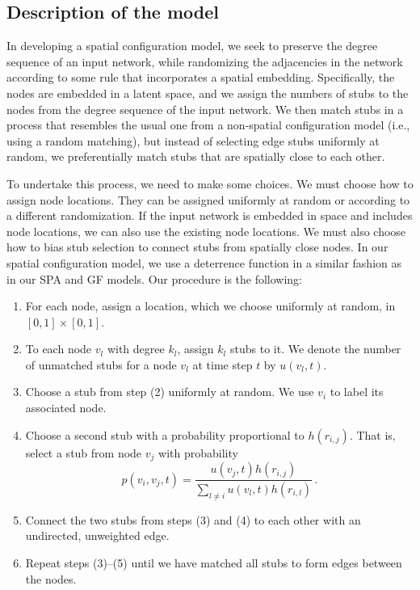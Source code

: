 \documentclass[%
 reprint,
 amsmath,amssymb,
 aps,
]{revtex4-1}
\begin{document}

\subsection{Description of the model}

In developing a spatial configuration model, we seek to preserve the degree sequence of an input network, while randomizing the adjacencies in the network according to some rule that incorporates a spatial embedding. Specifically, the nodes are embedded in a latent space, and we assign the numbers of stubs to the nodes from the degree sequence of the input network. We then match stubs in a process that resembles the usual one from a non-spatial configuration model \cite{fosdick} (i.e., using a random matching), but instead of selecting edge stubs uniformly at random, we preferentially match stubs that are spatially close to each other.


To undertake this process, we need to make some choices. We must choose how to assign node locations. They can be assigned uniformly at random or according to a different randomization. If the input network is embedded in space and includes node locations, we can also use the existing node locations. We must also choose how to bias stub selection to connect stubs from spatially close nodes. In our spatial configuration model, we use a deterrence function in a similar fashion as in our SPA and GF models. Our procedure is the following:
\begin{enumerate}
    \item For each node, assign a location, which we choose uniformly at random, in $[0, 1] \times [0, 1]$.
    \item To each node $v_l$ with degree $k_l$, assign $k_l$ stubs to it. We denote the number of unmatched stubs for a node $v_l$ at time step $t$ by $u(v_l, t)$.
    \item Choose a stub from step (2) uniformly at random. We use $v_i$ to label its associated node.
    \item Choose a second stub with a probability proportional to $h(r_{i,j})$. That is, select a stub from node $v_j$ with probability
   \begin{equation*}
        p(v_i, v_j, t) = \frac{u(v_j, t)h(r_{i,j})}{\sum_{l \neq i} u(v_l, t)h(r_{i,l})} \,.
    \end{equation*}
    \item Connect the two stubs from steps (3) and (4) to each other with an undirected, unweighted edge. 
    \item Repeat steps (3)--(5) until we have matched all stubs to form edges between the nodes.
\end{enumerate}
\end{document}
